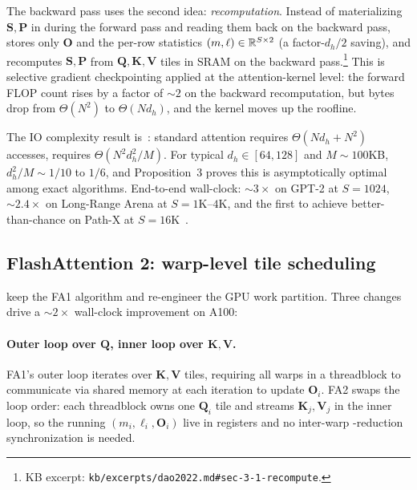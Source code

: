 The backward pass uses the second \citet{dao2022} idea:
\emph{recomputation}. Instead of materializing
$\boldsymbol{S}, \boldsymbol{P}$ in  during the forward pass and
reading them back on the backward pass,  stores only
$\boldsymbol{O}$ and the per-row statistics
$(m, \ell) \in \mathbb{R}^{S \times 2}$ (a factor-$d_h/2$ saving), and
recomputes $\boldsymbol{S}, \boldsymbol{P}$ from
$\boldsymbol{Q}, \boldsymbol{K}, \boldsymbol{V}$ tiles in SRAM on the
backward pass.\footnote{KB excerpt:
\texttt{kb/excerpts/dao2022.md\#sec-3-1-recompute}.} This is selective
gradient checkpointing applied at the attention-kernel level: the
forward FLOP count rises by a factor of $\sim\!2$ on the backward
recomputation, but  bytes drop from $\Theta(N^2)$ to $\Theta(N
d_h)$, and the kernel moves up the roofline.

The IO complexity result is~\citep[Thm.~2]{dao2022}: standard
attention requires $\Theta(N d_h + N^2)$  accesses, 
requires $\Theta(N^2 d_h^2 / M)$. For typical $d_h \in [64, 128]$ and
$M \sim 100$KB, $d_h^2 / M \sim 1/10$ to $1/6$, and Proposition~3
proves this is asymptotically optimal among exact algorithms. End-to-end
wall-clock: $\sim\!3\times$ on GPT-2 at $S = 1024$, $\sim\!2.4\times$
on Long-Range Arena at $S = 1\text{K}\text{--}4\text{K}$, and the first
 to achieve better-than-chance on Path-X at $S =
16\text{K}$~\citep[\S 1]{dao2022}.

\subsection{FlashAttention 2: warp-level tile scheduling}
\label{sec:fa2}

\citet{dao2023} keep the FA1 algorithm and re-engineer the GPU work
partition. Three changes drive a
$\sim\!2\times$ wall-clock improvement on A100:

\paragraph{Outer loop over $\boldsymbol{Q}$, inner loop over
$\boldsymbol{K}, \boldsymbol{V}$.} FA1's outer loop iterates over
$\boldsymbol{K}, \boldsymbol{V}$ tiles, requiring all warps in a
threadblock to communicate via shared memory at each iteration to
update $\boldsymbol{O}_i$. FA2 swaps the loop order: each threadblock
owns one $\boldsymbol{Q}_i$ tile and streams $\boldsymbol{K}_j,
\boldsymbol{V}_j$ in the inner loop, so the running
$(m_i, \ell_i, \boldsymbol{O}_i)$ live in registers and no inter-warp
-reduction synchronization is needed.

